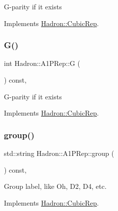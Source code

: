 G-\/parity if it exists 

Implements \mbox{\hyperlink{structHadron_1_1CubicRep_a52104e43266d1614c00bbd1c3b395458}{Hadron\+::\+Cubic\+Rep}}.

\mbox{\label{structHadron_1_1A1PRep_ab530e4430b28d16940ad3c922b253c70}} 
\subsubsection{\texorpdfstring{G()}{G()}\hspace{0.1cm}{\footnotesize\ttfamily [3/3]}}
{\footnotesize\ttfamily int Hadron\+::\+A1\+P\+Rep\+::G (\begin{DoxyParamCaption}{ }\end{DoxyParamCaption}) const\hspace{0.3cm}{\ttfamily [inline]}, {\ttfamily [virtual]}}

G-\/parity if it exists 

Implements \mbox{\hyperlink{structHadron_1_1CubicRep_a52104e43266d1614c00bbd1c3b395458}{Hadron\+::\+Cubic\+Rep}}.

\mbox{\label{structHadron_1_1A1PRep_a62ee0e58d7e0763955b3c738cbcfdd4d}} 
\subsubsection{\texorpdfstring{group()}{group()}\hspace{0.1cm}{\footnotesize\ttfamily [1/3]}}
{\footnotesize\ttfamily std\+::string Hadron\+::\+A1\+P\+Rep\+::group (\begin{DoxyParamCaption}{ }\end{DoxyParamCaption}) const\hspace{0.3cm}{\ttfamily [inline]}, {\ttfamily [virtual]}}

Group label, like Oh, D2, D4, etc. 

Implements \mbox{\hyperlink{structHadron_1_1CubicRep_a0748f11ec87f387062c8e8981339a29c}{Hadron\+::\+Cubic\+Rep}}.

\mbox{\label{structHadron_1_1A1PRep_a62ee0e58d7e0763955b3c738cbcfdd4d}} 
